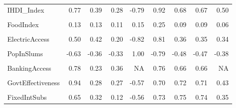 \documentclass[
]{article}
\begin{document}
\begin{table}
{\begin{tabular}[t]{lrrrrrrrr}
IHDI\_Index & 0.77 & 0.39 & 0.28 & -0.79 & 0.92 & 0.68 & 0.67 & 0.50\\
\cellcolor{gray!10}{GiniCoeff} & \cellcolor{gray!10}{-0.68} & \cellcolor{gray!10}{-0.38} & \cellcolor{gray!10}{-0.28} & \cellcolor{gray!10}{0.80} & \cellcolor{gray!10}{-0.86} & \cellcolor{gray!10}{-0.57} & \cellcolor{gray!10}{-0.57} & \cellcolor{gray!10}{-0.41}\\
FoodIndex & 0.13 & 0.13 & 0.11 & 0.15 & 0.25 & 0.09 & 0.09 & 0.06\\
\cellcolor{gray!10}{CorruptionScore} & \cellcolor{gray!10}{0.94} & \cellcolor{gray!10}{0.26} & \cellcolor{gray!10}{0.35} & \cellcolor{gray!10}{-0.42} & \cellcolor{gray!10}{0.61} & \cellcolor{gray!10}{0.73} & \cellcolor{gray!10}{0.72} & \cellcolor{gray!10}{0.43}\\
\addlinespace
ElectricAccess & 0.50 & 0.42 & 0.20 & -0.82 & 0.81 & 0.36 & 0.35 & 0.34\\
\cellcolor{gray!10}{PopDensity} & \cellcolor{gray!10}{0.18} & \cellcolor{gray!10}{-0.01} & \cellcolor{gray!10}{-0.15} & \cellcolor{gray!10}{-0.07} & \cellcolor{gray!10}{0.13} & \cellcolor{gray!10}{0.26} & \cellcolor{gray!10}{0.29} & \cellcolor{gray!10}{0.37}\\
PopInSlums & -0.63 & -0.36 & -0.33 & 1.00 & -0.79 & -0.48 & -0.47 & -0.38\\
\cellcolor{gray!10}{WaterStress} & \cellcolor{gray!10}{0.05} & \cellcolor{gray!10}{-0.02} & \cellcolor{gray!10}{0.06} & \cellcolor{gray!10}{-0.12} & \cellcolor{gray!10}{0.10} & \cellcolor{gray!10}{0.01} & \cellcolor{gray!10}{0.02} & \cellcolor{gray!10}{0.61}\\
BankingAccess & 0.78 & 0.23 & 0.36 & NA & 0.76 & 0.66 & 0.66 & NA\\
\addlinespace
\cellcolor{gray!10}{RnDInvest} & \cellcolor{gray!10}{0.70} & \cellcolor{gray!10}{0.11} & \cellcolor{gray!10}{0.32} & \cellcolor{gray!10}{-0.23} & \cellcolor{gray!10}{0.54} & \cellcolor{gray!10}{0.71} & \cellcolor{gray!10}{0.69} & \cellcolor{gray!10}{0.21}\\
GovtEffectiveness & 0.94 & 0.28 & 0.27 & -0.57 & 0.70 & 0.72 & 0.71 & 0.43\\
\cellcolor{gray!10}{ShippingIndex} & \cellcolor{gray!10}{0.39} & \cellcolor{gray!10}{0.16} & \cellcolor{gray!10}{-0.02} & \cellcolor{gray!10}{-0.27} & \cellcolor{gray!10}{0.46} & \cellcolor{gray!10}{0.43} & \cellcolor{gray!10}{0.39} & \cellcolor{gray!10}{0.17}\\
FixedIntSubs & 0.65 & 0.32 & 0.12 & -0.56 & 0.73 & 0.75 & 0.74 & 0.35\\

\end{tabular}}
\end{table}
\end{document}
